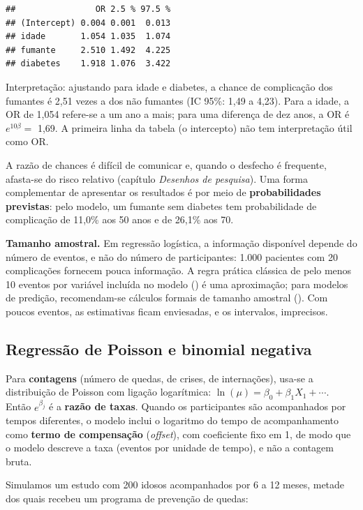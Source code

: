 \documentclass[
]{book}
\begin{document}
\begin{verbatim}
##                OR 2.5 % 97.5 %
## (Intercept) 0.004 0.001  0.013
## idade       1.054 1.035  1.074
## fumante     2.510 1.492  4.225
## diabetes    1.918 1.076  3.422
\end{verbatim}

Interpretação: ajustando para idade e diabetes, a chance de complicação dos fumantes é 2,51 vezes a dos não fumantes (IC 95\%: 1,49 a 4,23). Para a idade, a OR de 1,054 refere-se a um ano a mais; para uma diferença de dez anos, a OR é \(e^{10\beta} =\) 1,69. A primeira linha da tabela (o intercepto) não tem interpretação útil como OR.

A razão de chances é difícil de comunicar e, quando o desfecho é frequente, afasta-se do risco relativo (capítulo \emph{Desenhos de pesquisa}). Uma forma complementar de apresentar os resultados é por meio de \textbf{probabilidades previstas}: pelo modelo, um fumante sem diabetes tem probabilidade de complicação de 11,0\% aos 50 anos e de 26,1\% aos 70.

\textbf{Tamanho amostral.} Em regressão logística, a informação disponível depende do número de eventos, e não do número de participantes: 1.000 pacientes com 20 complicações fornecem pouca informação. A regra prática clássica de pelo menos 10 eventos por variável incluída no modelo () é uma aproximação; para modelos de predição, recomendam-se cálculos formais de tamanho amostral (). Com poucos eventos, as estimativas ficam enviesadas, e os intervalos, imprecisos.

\subsection{Regressão de Poisson e binomial negativa}\label{regressuxe3o-de-poisson-e-binomial-negativa}

Para \textbf{contagens} (número de quedas, de crises, de internações), usa-se a distribuição de Poisson com ligação logarítmica: \(\ln(\mu) = \beta_0 + \beta_1 X_1 + \cdots\). Então \(e^{\beta_j}\) é a \textbf{razão de taxas}. Quando os participantes são acompanhados por tempos diferentes, o modelo inclui o logaritmo do tempo de acompanhamento como \textbf{termo de compensação} (\emph{offset}), com coeficiente fixo em 1, de modo que o modelo descreve a taxa (eventos por unidade de tempo), e não a contagem bruta.

Simulamos um estudo com 200 idosos acompanhados por 6 a 12 meses, metade dos quais recebeu um programa de prevenção de quedas:
\end{document}
